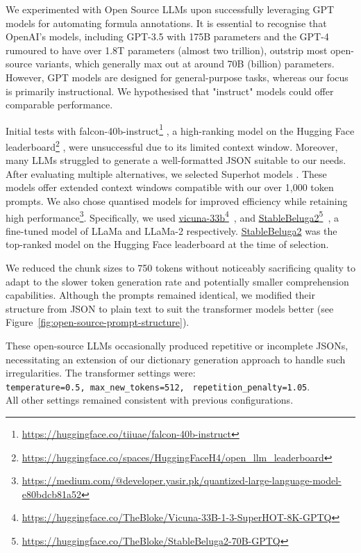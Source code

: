 We experimented with Open Source LLMs upon successfully leveraging GPT models for automating formula annotations. It is essential to recognise that OpenAI's models, including GPT-3.5 with 175B parameters and the GPT-4 rumoured to have over 1.8T parameters (almost two trillion), outstrip most open-source variants, which generally max out at around 70B (billion) parameters. However, GPT models are designed for general-purpose tasks, whereas our focus is primarily instructional. We hypothesised that "instruct" models could offer comparable performance.

Initial tests with falcon-40b-instruct\footnote{\url{https://huggingface.co/tiiuae/falcon-40b-instruct}} \citep{falcon40b, refinedweb, xu2023baize}, a high-ranking model on the Hugging Face leaderboard\footnote{\url{https://huggingface.co/spaces/HuggingFaceH4/open_llm_leaderboard}} \citep{jain2022hugging}, were unsuccessful due to its limited context window. Moreover, many LLMs struggled to generate a well-formatted JSON suitable to our needs. After evaluating multiple alternatives, we selected Superhot models \citep{chen2023extending}. These models offer extended context windows compatible with our over 1,000 token prompts. We also chose quantised models for improved efficiency while retaining high performance\footnote{\url{https://medium.com/@developer.yasir.pk/quantized-large-language-model-e80bdcb81a52}}. Specifically, we used \href{https://huggingface.co/TheBloke/Vicuna-33B-1-3-SuperHOT-8K-GPTQ}{vicuna-33b}\footnote{\url{https://huggingface.co/TheBloke/Vicuna-33B-1-3-SuperHOT-8K-GPTQ}}~\citep{zheng2023judging}, and \href{https://huggingface.co/TheBloke/StableBeluga2-70B-GPTQ}{StableBeluga2}\footnote{\url{https://huggingface.co/TheBloke/StableBeluga2-70B-GPTQ}}~\citep{StableBelugaModels, touvron2023llama, mukherjee2023orca}, a fine-tuned model of LLaMa and LLaMa-2 respectively. \href{https://huggingface.co/TheBloke/StableBeluga2-70B-GPTQ}{StableBeluga2} was the top-ranked model on the Hugging Face leaderboard at the time of selection.

We reduced the chunk sizes to 750 tokens without noticeably sacrificing quality to adapt to the slower token generation rate and potentially smaller comprehension capabilities. Although the prompts remained identical, we modified their structure from JSON to plain text to suit the transformer models better (see Figure~\ref{fig:open-source-prompt-structure}). 

These open-source LLMs occasionally produced repetitive or incomplete JSONs, necessitating an extension of our dictionary generation approach to handle such irregularities. The transformer settings were:\\
\texttt{temperature=0.5, max\_new\_tokens=512,} \texttt{ repetition\_penalty=1.05}.\\
All other settings remained consistent with previous configurations.

